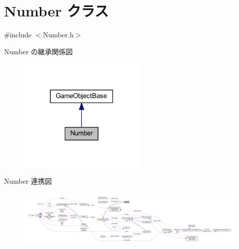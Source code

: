 \hypertarget{class_number}{}\section{Number クラス}
\label{class_number}


{\ttfamily \#include $<$Number.\+h$>$}



Number の継承関係図\nopagebreak
\begin{figure}[H]
\begin{center}
\leavevmode
\includegraphics[width=174pt]{class_number__inherit__graph}
\end{center}
\end{figure}


Number 連携図\nopagebreak
\begin{figure}[H]
\begin{center}
\leavevmode
\includegraphics[width=350pt]{class_number__coll__graph}
\end{center}
\end{figure}
